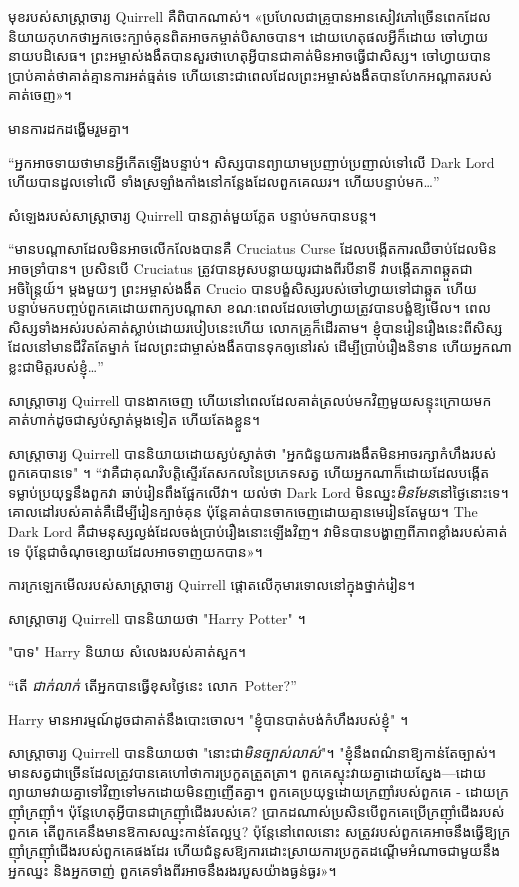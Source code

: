 {{{{មុខរបស់សាស្រ្តាចារ្យ Quirrell គឺពិបាកណាស់។ «ប្រហែល​ជា​គ្រូ​បាន​អាន​សៀវភៅ​ច្រើន​ពេក​ដែល​និយាយ​កុហក​ថា​អ្នក​ចេះ​ក្បាច់​គុន​ពិត​អាច​កម្ចាត់​បិសាច​បាន។ ដោយហេតុផលអ្វីក៏ដោយ ចៅហ្វាយនាយបដិសេធ។ ព្រះអម្ចាស់ងងឹតបានសួរថាហេតុអ្វីបានជាគាត់មិនអាចធ្វើជាសិស្ស។ ចៅហ្វាយបានប្រាប់គាត់ថាគាត់គ្មានការអត់ធ្មត់ទេ ហើយនោះជាពេលដែលព្រះអម្ចាស់ងងឹតបានហែកអណ្តាតរបស់គាត់ចេញ»។

មានការដកដង្ហើមរួមគ្នា។

“អ្នកអាចទាយថាមានអ្វីកើតឡើងបន្ទាប់។ សិស្ស​បាន​ព្យាយាម​ប្រញាប់ប្រញាល់​ទៅ​លើ Dark Lord ហើយ​បាន​ដួល​ទៅ​លើ ទាំង​ស្រឡាំងកាំង​នៅ​កន្លែង​ដែល​ពួកគេ​ឈរ។ ហើយបន្ទាប់មក…”

សំឡេង​របស់​សាស្ត្រាចារ្យ Quirrell បាន​ភ្លាត់​មួយ​ភ្លែត បន្ទាប់​មក​បាន​បន្ត។

“មានបណ្តាសាដែលមិនអាចលើកលែងបានគឺ Cruciatus Curse ដែលបង្កើតការឈឺចាប់ដែលមិនអាចទ្រាំបាន។ ប្រសិនបើ Cruciatus ត្រូវបានអូសបន្លាយយូរជាងពីរបីនាទី វាបង្កើតភាពឆ្កួតជាអចិន្ត្រៃយ៍។ ម្តងមួយៗ ព្រះអម្ចាស់ងងឹត Crucio បានបង្ខំសិស្សរបស់ចៅហ្វាយទៅជាឆ្កួត ហើយបន្ទាប់មកបញ្ចប់ពួកគេដោយពាក្យបណ្តាសា ខណៈពេលដែលចៅហ្វាយត្រូវបានបង្ខំឱ្យមើល។ ពេល​សិស្ស​ទាំង​អស់​របស់​គាត់​ស្លាប់​ដោយ​របៀប​នេះ​ហើយ លោកគ្រូ​ក៏​ដើរ​តាម។ ខ្ញុំបានរៀនរឿងនេះពីសិស្សដែលនៅមានជីវិតតែម្នាក់ ដែលព្រះជាម្ចាស់ងងឹតបានទុកឲ្យនៅរស់ ដើម្បីប្រាប់រឿងនិទាន ហើយអ្នកណាខ្លះជាមិត្តរបស់ខ្ញុំ…”

សាស្រ្តាចារ្យ Quirrell បានងាកចេញ ហើយនៅពេលដែលគាត់ត្រលប់មកវិញមួយសន្ទុះក្រោយមក គាត់ហាក់ដូចជាស្ងប់ស្ងាត់ម្តងទៀត ហើយតែងខ្លួន។

សាស្ត្រាចារ្យ Quirrell បាននិយាយដោយស្ងប់ស្ងាត់ថា "អ្នកជំនួយការងងឹតមិនអាចរក្សាកំហឹងរបស់ពួកគេបានទេ" ។ “វាគឺជាគុណវិបត្តិស្ទើរតែសកលនៃប្រភេទសត្វ ហើយអ្នកណាក៏ដោយដែលបង្កើតទម្លាប់ប្រយុទ្ធនឹងពួកវា ឆាប់រៀនពឹងផ្អែកលើវា។ យល់ថា Dark Lord មិនឈ្នះ\emph{មិនមែន}នៅថ្ងៃនោះទេ។ គោលដៅរបស់គាត់គឺដើម្បីរៀនក្បាច់គុន ប៉ុន្តែគាត់បានចាកចេញដោយគ្មានមេរៀនតែមួយ។ The Dark Lord គឺជាមនុស្សល្ងង់ដែលចង់ប្រាប់រឿងនោះឡើងវិញ។ វា​មិន​បាន​បង្ហាញ​ពី​ភាព​ខ្លាំង​របស់​គាត់​ទេ ប៉ុន្តែ​ជា​ចំណុច​ខ្សោយ​ដែល​អាច​ទាញ​យក​បាន»។

ការក្រឡេកមើលរបស់សាស្រ្តាចារ្យ Quirrell ផ្តោតលើកុមារទោលនៅក្នុងថ្នាក់រៀន។

សាស្រ្តាចារ្យ Quirrell បាននិយាយថា "Harry Potter" ។

"បាទ" Harry និយាយ សំលេងរបស់គាត់ស្អក។

“តើ \emph{ជាក់លាក់} តើអ្នកបានធ្វើខុសថ្ងៃនេះ លោក~Potter?”

Harry មានអារម្មណ៍ដូចជាគាត់នឹងបោះចោល។ "ខ្ញុំបានបាត់បង់កំហឹងរបស់ខ្ញុំ" ។

សាស្រ្តាចារ្យ Quirrell បាននិយាយថា "នោះជា\emph{មិនច្បាស់លាស់}"។ "ខ្ញុំនឹងពណ៌នាឱ្យកាន់តែច្បាស់។ មាន​សត្វ​ជា​ច្រើន​ដែល​ត្រូវ​បាន​គេ​ហៅ​ថា​ការ​ប្រកួត​ត្រួតត្រា។ ពួក​គេ​ស្ទុះ​វាយ​គ្នា​ដោយ​ស្នែង—ដោយ​ព្យាយាម​វាយ​គ្នា​ទៅ​វិញ​ទៅ​មក​ដោយ​មិន​ញញើត​គ្នា។ ពួកគេប្រយុទ្ធដោយក្រញាំរបស់ពួកគេ - ដោយក្រញ៉ាំក្រញ៉ាំ។ ប៉ុន្តែ​ហេតុ​អ្វី​បាន​ជា​ក្រញ៉ាំ​ជើង​របស់​គេ? ប្រាកដ​ណាស់​ប្រសិន​បើ​ពួក​គេ​ប្រើ​ក្រញ៉ាំ​ជើង​របស់​ពួក​គេ តើ​ពួក​គេ​នឹង​មាន​ឱកាស​ឈ្នះ​កាន់​តែ​ល្អ​ឬ? ប៉ុន្តែនៅពេលនោះ សត្រូវរបស់ពួកគេអាចនឹងធ្វើឱ្យក្រញ៉ាំក្រញ៉ាំជើងរបស់ពួកគេផងដែរ ហើយជំនួសឱ្យការដោះស្រាយការប្រកួតដណ្តើមអំណាចជាមួយនឹងអ្នកឈ្នះ និងអ្នកចាញ់ ពួកគេទាំងពីរអាចនឹងរងរបួសយ៉ាងធ្ងន់ធ្ងរ»។

}}}}
